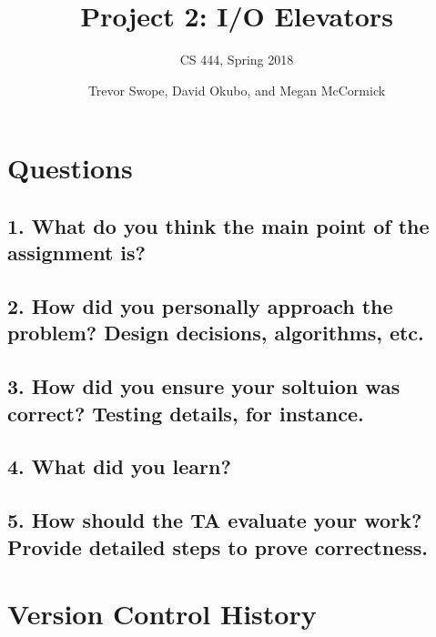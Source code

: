 \documentclass[letterpaper,10pt]{article}
\title{Project 2: I/O Elevators}
\subtitle{CS 444, Spring 2018}
\author{Trevor Swope, David Okubo, and Megan McCormick}
\begin{document}
\begin{titlingpage}
\maketitle 
\begin{abstract}

\end{abstract}
\end{titlingpage}
\section{Questions}
\subsection{1. What do you think the main point of the assignment is?}

\subsection{2. How did you personally approach the problem? Design decisions, algorithms, etc.}

\subsection{3. How did you ensure your soltuion was correct? Testing details, for instance.}

\subsection{4. What did you learn?}

\subsection{5. How should the TA evaluate your work? Provide detailed steps to prove correctness.}

\section{Version Control History}


\nocite{*}



\end{document}
